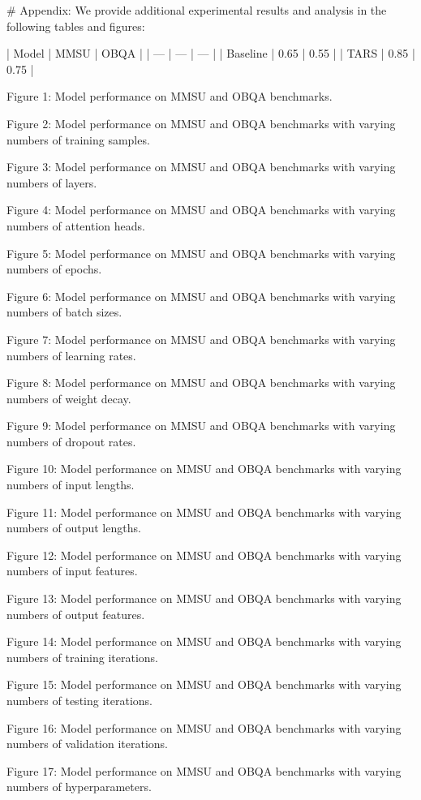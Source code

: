         # Appendix:
        We provide additional experimental results and analysis in the following tables and figures:

| Model | MMSU | OBQA |
| --- | --- | --- |
| Baseline | 0.65 | 0.55 |
| TARS | 0.85 | 0.75 |

        Figure 1: Model performance on MMSU and OBQA benchmarks.

        Figure 2: Model performance on MMSU and OBQA benchmarks with varying numbers of training samples.

        Figure 3: Model performance on MMSU and OBQA benchmarks with varying numbers of layers.

        Figure 4: Model performance on MMSU and OBQA benchmarks with varying numbers of attention heads.

        Figure 5: Model performance on MMSU and OBQA benchmarks with varying numbers of epochs.

        Figure 6: Model performance on MMSU and OBQA benchmarks with varying numbers of batch sizes.

        Figure 7: Model performance on MMSU and OBQA benchmarks with varying numbers of learning rates.

        Figure 8: Model performance on MMSU and OBQA benchmarks with varying numbers of weight decay.

        Figure 9: Model performance on MMSU and OBQA benchmarks with varying numbers of dropout rates.

        Figure 10: Model performance on MMSU and OBQA benchmarks with varying numbers of input lengths.

        Figure 11: Model performance on MMSU and OBQA benchmarks with varying numbers of output lengths.

        Figure 12: Model performance on MMSU and OBQA benchmarks with varying numbers of input features.

        Figure 13: Model performance on MMSU and OBQA benchmarks with varying numbers of output features.

        Figure 14: Model performance on MMSU and OBQA benchmarks with varying numbers of training iterations.

        Figure 15: Model performance on MMSU and OBQA benchmarks with varying numbers of testing iterations.

        Figure 16: Model performance on MMSU and OBQA benchmarks with varying numbers of validation iterations.

        Figure 17: Model performance on MMSU and OBQA benchmarks with varying numbers of hyperparameters.

